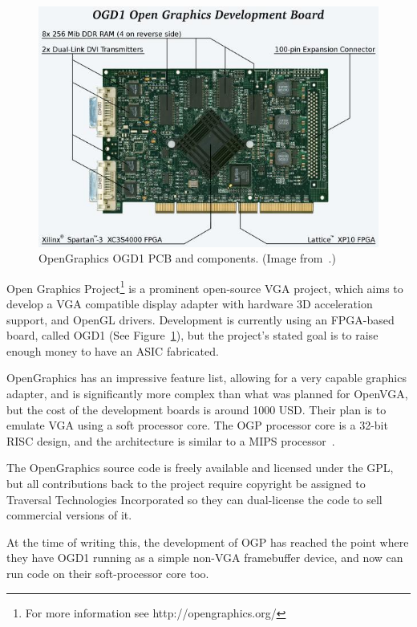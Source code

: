 \begin{figure}[h!]
\begin{center}
\includegraphics[width=\linewidth]{images/ogd1_showcase.jpeg}
\end{center}
\caption[OpenGraphics OGD1]{OpenGraphics OGD1 PCB and components. (Image
from~\cite{OpenGraphics}.)}
\label{INTRO_OGD1}
\end{figure}

Open Graphics Project\footnote{For more information see http://opengraphics.org/}
is a prominent open-source VGA project, which aims to develop a VGA compatible
display adapter with hardware 3D acceleration support, and OpenGL drivers.
Development is currently using an FPGA-based board, called OGD1 (See
Figure~\ref{INTRO_OGD1}), but the project's stated goal is to raise enough money
to have an ASIC fabricated.

OpenGraphics has an impressive feature list, allowing for a very capable graphics
adapter, and is significantly more complex than what was planned for OpenVGA, but
the cost of the development boards is around 1000 USD. Their plan is to emulate
VGA using a soft processor core. The OGP processor core is a 32-bit RISC design,
and the architecture is similar to a MIPS processor~\cite{OpenGraphics}.

The OpenGraphics source code is freely available and licensed under the GPL, but
all contributions back to the project require copyright be assigned to Traversal
Technologies Incorporated so they can dual-license the code to sell commercial
versions of it.

At the time of writing this, the development of OGP has reached the point where
they have OGD1 running as a simple non-VGA framebuffer device, and now can run
code on their soft-processor core too.


